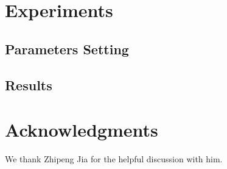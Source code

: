 \documentclass[11pt]{article}
\begin{document}
\section{Experiments}

\subsection{Parameters Setting}

\subsection{Results}

\section*{Acknowledgments}
We thank Zhipeng Jia for the helpful discussion with him.




\end{document}
